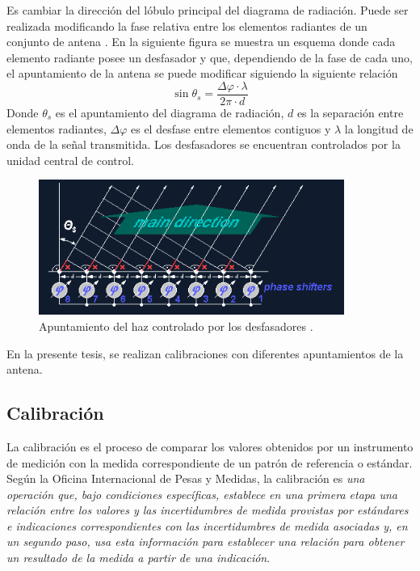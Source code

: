 Es cambiar la dirección del lóbulo principal del diagrama de radiación. Puede ser realizada modificando la fase relativa entre
los elementos radiantes de un conjunto de antena \cite{Standard1996}. En la siguiente figura se muestra un esquema donde cada 
elemento radiante posee un desfasador y que, dependiendo de la fase de cada uno, el apuntamiento de la antena se puede modificar
siguiendo la siguiente relación
\begin{equation}
	\sin{\theta_s} = \dfrac{\Delta\varphi\cdot\lambda}{2\pi\cdot d}
	\label{phaseShiftToPointing}
\end{equation}
Donde $\theta_s$ es el apuntamiento del diagrama de radiación, $d$ es la separación entre elementos radiantes, $\Delta\varphi$ es el
desfase entre elementos contiguos y $\lambda$ la longitud de onda de la señal transmitida. Los desfasadores se encuentran 
controlados por la unidad central de control.

\begin{figure}[H]
 \centering
 \includegraphics[width=10cm]{gfx/beamSteering.png}
 \caption{Apuntamiento del haz controlado por los desfasadores \cite{BeamSteering}.}
\end{figure}

En la presente tesis, se realizan calibraciones con diferentes apuntamientos de la antena.  

\subsection{Calibración}

La calibración es el proceso de comparar los valores obtenidos por un instrumento de medición con la
medida correspondiente de un patrón de referencia o estándar. Según la Oficina Internacional de Pesas y Medidas, la 
calibración es \textit{una operación que, bajo condiciones específicas, establece en una primera etapa una relación entre
los valores y las incertidumbres de medida provistas por estándares e indicaciones correspondientes con las incertidumbres de 
medida asociadas y, en un segundo paso, usa esta información para establecer una relación para obtener un resultado de la 
medida a partir de una indicación}.

